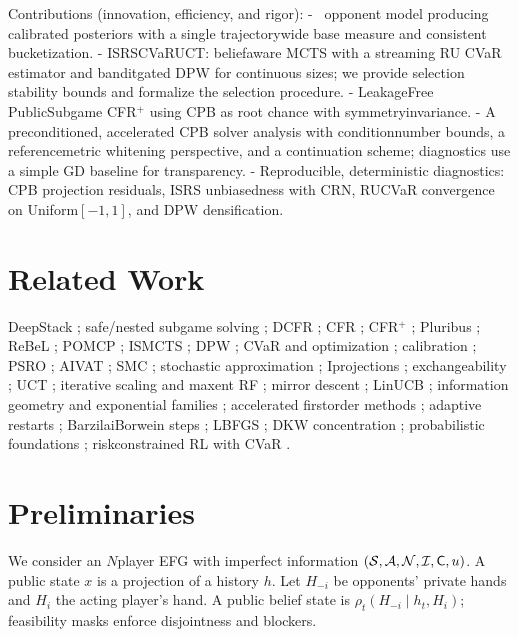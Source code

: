 Contributions (innovation, efficiency, and rigor):
- \sCRF\ opponent model producing calibrated posteriors with a single trajectory\textendash wide base measure and consistent bucketization.
- IS\textendash RS\textendash CVaR\textendash UCT: belief\textendash aware MCTS with a streaming RU CVaR estimator and bandit\textendash gated DPW for continuous sizes; we provide selection stability bounds and formalize the selection procedure.
- Leakage\textendash Free Public\textendash Subgame CFR$^+$ using CPB as root chance with symmetry\textendash invariance.
- A preconditioned, accelerated CPB solver analysis with condition\textendash number bounds, a reference\textendash metric whitening perspective, and a continuation scheme; diagnostics use a simple GD baseline for transparency.
- Reproducible, deterministic diagnostics: CPB projection residuals, IS\textendash RS unbiasedness with CRN, RU\textendash CVaR convergence on Uniform$[-1,1]$, and DPW densification.

\section{Related Work}
DeepStack \cite{moravcik2017deepstack}; safe/nested subgame solving \cite{brown2018safe}; DCFR \cite{brown2019dcfr}; CFR \cite{zinkevich2007cfr}; CFR$^+$ \cite{tammelin2014cfrplus}; Pluribus \cite{brown2019pluribus}; ReBeL \cite{brown2020rebel}; POMCP \cite{silver2010pomcp}; ISMCTS \cite{cowling2012ismcts}; DPW \cite{couetoux2011dpw}; CVaR and optimization \cite{rockafellar2000cvar,chow2014cvar,tamar2015cvar}; calibration \cite{guo2017calibration}; PSRO \cite{lanctot2017psro}; AIVAT \cite{burch2018aivat}; SMC \cite{doucet2001smc}; stochastic approximation \cite{borkar2008sa}; I\textendash projections \cite{csiszar1975i}; exchangeability \cite{diaconis1980finite}; UCT \cite{kocsis2006uct}; iterative scaling and maxent RF \cite{darroch1972gis,dellapietra1997pami}; mirror descent \cite{beck2003mirror}; LinUCB \cite{li2010linucb}; information geometry and exponential families \cite{wainwright2008graphical,amari2016ig}; accelerated first\textendash order methods \cite{nesterov2004introductory}; adaptive restarts \cite{odonoghue2015restart}; Barzilai\textendash Borwein steps \cite{barzilai1988bb}; L\textendash BFGS \cite{liu1989lbfgs}; DKW concentration \cite{massart1990dkw}; probabilistic foundations \cite{kallenberg2002fmp}; risk\textendash constrained RL with CVaR \cite{chow2017riskjmlr}.

\section{Preliminaries}
We consider an $N$\textendash player EFG with imperfect information $(\mathcal{S},\mathcal{A},\mathcal{N},\mathcal{I},\mathsf{C},u)$. A public state $x$ is a projection of a history $h$. Let $H_{-i}$ be opponents’ private hands and $H_i$ the acting player's hand. A public belief state is $\rho_t(H_{-i}\mid h_t,H_i)$; feasibility masks enforce disjointness and blockers.

